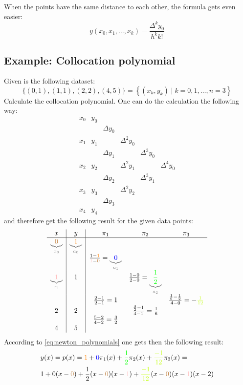 When the points have the same distance to each other, the formula gets even easier:
$$
y\left(x_0, x_1, \ldots, x_k\right)=\frac{\Delta^k y_0}{h^k k !}
$$
\subsection{Example: Collocation polynomial}
Given is the following dataset: 
$$
\{(0,1),(1,1),(2,2),(4,5)\}=\left\{\left(x_k, y_k\right) \mid k=0,1, \ldots, n=3\right\}
$$
Calculate the collocation polynomial.\newline\newline
One can do the calculation the following way:
\[
	\begin{array}{cccccc}
	x_0 & y_0 \\
	    &     & \Delta y_0 \\
	x_1 & y_1 &             & \Delta^2 y_0\\
	    &     & \Delta y_1  &              & \Delta^3 y_0\\
	x_2 & y_2 &             & \Delta^2 y_1 &             & \Delta^4 y_0\\
	    &     & \Delta y_2  &              & \Delta^3 y_1\\
	x_3 & y_3 &             & \Delta^2 y_2\\
	    &     & \Delta y_3 \\
	x_4 & y_4
	\end{array}
\]
and therefore get the following result for the given data points:
\[
	\begin{array}{c|c|ccc}
 x & y & \pi_1 & \pi_2 &\pi_3\\
\hline
	\textcolor{gray}{\underbrace{\textcolor{brown}{0}}_{x_0}} & \textcolor{gray}{\underbrace{\textcolor{orange}{1}}_{a_0}}\\
	    &     & \frac{1-\textcolor{orange}{1}}{\textcolor{pink}{1}-\textcolor{brown}{0}}=\textcolor{gray}{\underbrace{\textcolor{blue}{0}}_{a_1}} \\
	\textcolor{gray}{\underbrace{\textcolor{pink}{1}}_{x_1}} & 1&             & \frac{1-0}{2-0}=\textcolor{gray}{\underbrace{\textcolor{green}{\frac{1}{2}}}_{a_2}}\\
	    &     & \frac{2-1}{2-1}=1  &              & \frac{\frac{1}{6}-\frac{1}{2}}{4-0}=-\textcolor{lime}{\frac{1}{12}}\\
	2 & 2&             & \frac{\frac{3}{2}-1}{4-1}=\frac{1}{6}\\           
	    &     & \frac{5-2}{4-2}=\frac{3}{2}\\         
	4 & 5         

	\end{array}
\]
According to \autoref{eq:newton_polynomials} one gets then the following result:
$$
\begin{aligned}
&y(x)=p(x)=\textcolor{orange}{1}+\textcolor{blue}{0} \pi_1(x)+\textcolor{green}{\frac{1}{2}} \pi_2(x)+\textcolor{lime}{\frac{-1}{12}} \pi_3(x)= \\
&1+0(x-\textcolor{brown}{0})+\frac{1}{2}(x-\textcolor{brown}{0})(x-\textcolor{pink}{1})+\textcolor{lime}{\frac{-1}{12}}(x-\textcolor{brown}{0})(x-\textcolor{pink}{1})(x-2)
\end{aligned}
$$
